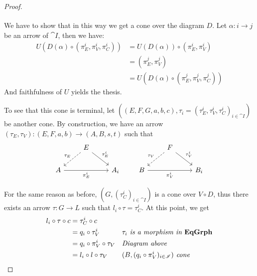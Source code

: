 \begin{proof}
\[\begin{tikzcd}
        \end{tikzcd}
    \]
    We have to show that in this way we get a cone over the diagram $D$. Let $\alpha : i\to j$ be an arrow of $\cat{I}$, then we have:
    \begin{align*}
    U(D(\alpha)\circ (\pi_E^i, \pi_V^i, \pi_C^i))  &=  U(D(\alpha))\circ(\pi_E^i, \pi_V^i)\\
                                                   &=  (\pi_E^j, \pi_V^j)\\
                                                   &=  U(D(\alpha)\circ (\pi_E^j, \pi_V^j, \pi_C^j))
    \end{align*}
    And faithfulness of $U$ yields the thesis.

    To see that this cone is terminal, let $((E, F, G, a, b, c), \tau_i = (\tau_E^i, \tau_V^i, \tau_C^i)_{i \in \cat I})$ be another cone. By construction, we have an arrow $(\tau_E, \tau_V):(E, F, a, b) \to (A, B, s, t)$ such that
    \[
        \begin{tikzcd}
            & E \arrow[dl, dashed, "{\tau_E}" swap] \arrow[dr, "{\tau_E^i}"] & \\
            A \arrow[rr, "{\pi_E^i}" swap] & & A_i 
        \end{tikzcd}
        \qquad
        \begin{tikzcd}
            & F \arrow[dl, dashed, "{\tau_V}" swap] \arrow[dr, "{\tau_V^i}"] & \\
            B \arrow[rr, "{\pi_V^i}" swap] & & B_i 
        \end{tikzcd}
    \]

    For the same reason as before, $(G, (\tau_C^i)_{i\in \cat I})$ is a cone over $V \circ D$, thus there exists an arrow $\tau : G \to L$ such that $l_i \circ \tau = \tau_C^i$. At this point, we get
    \begin{align*}
        l_i\circ \tau \circ c 
                        &= \tau_C^i\circ c              && \\
                        &=q_i\circ \tau_V^i             && \textit{$\tau_i$ is a morphism in $\mathbf{EqGrph}$}\\
                        &=q_i\circ \pi_V^i\circ \tau_V  && \textit{Diagram above} \\
                        &=l_i\circ l\circ \tau_V        && \textit{$(B, (q_i\circ \pi_V^i)_{i \in \mathscr{I}})$ cone} 
    \end{align*} 


\end{proof}
